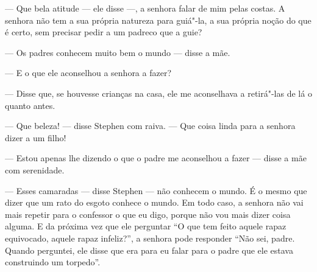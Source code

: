 --- Que bela atitude --- ele disse ---, a senhora falar de mim
pelas costas.  A senhora não tem a sua própria natureza para guiá"-la, a
sua própria noção do que é certo, sem precisar pedir a um padreco que a
guie?

--- Os padres conhecem muito bem o mundo --- disse a mãe.

--- E o que ele aconselhou a senhora a fazer?

--- Disse que, se houvesse crianças na casa, ele me aconselhava a
retirá"-las de lá o quanto antes.

--- Que beleza! --- disse Stephen com raiva.  --- Que coisa linda
para a senhora dizer a um filho!

--- Estou apenas lhe dizendo o que o padre me aconselhou a fazer
--- disse a mãe com serenidade.

--- Esses camaradas --- disse Stephen --- não conhecem o mundo.  É o
mesmo que dizer que um rato do esgoto conhece o mundo.  Em todo caso, a
senhora não vai mais repetir para o confessor o que eu digo, porque não
vou mais dizer coisa alguma.  E da próxima vez que ele perguntar “O que
tem feito aquele rapaz equivocado, aquele rapaz infeliz?”, a senhora
pode responder “Não sei, padre.  Quando perguntei, ele disse que era
para eu falar para o padre que ele estava construindo um torpedo”.

